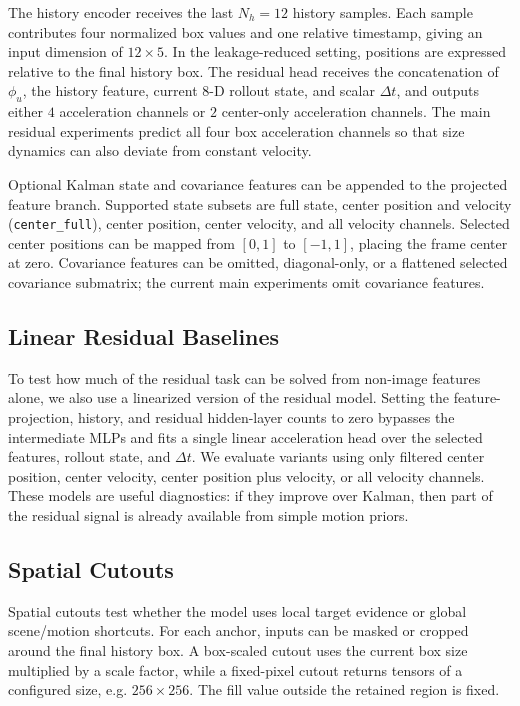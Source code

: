 The history encoder receives the last $N_h=12$ history samples. Each sample contributes four normalized box values and one relative timestamp, giving an input dimension of $12 \times 5$. In the leakage-reduced setting, positions are expressed relative to the final history box. The residual head receives the concatenation of $\phi_u$, the history feature, current $8$-D rollout state, and scalar $\Delta t$, and outputs either $4$ acceleration channels or $2$ center-only acceleration channels. The main residual experiments predict all four box acceleration channels so that size dynamics can also deviate from constant velocity.

Optional Kalman state and covariance features can be appended to the projected feature branch. Supported state subsets are full state, center position and velocity (\texttt{center\_full}), center position, center velocity, and all velocity channels. Selected center positions can be mapped from $[0,1]$ to $[-1,1]$, placing the frame center at zero. Covariance features can be omitted, diagonal-only, or a flattened selected covariance submatrix; the current main experiments omit covariance features.

\subsection{Linear Residual Baselines}

To test how much of the residual task can be solved from non-image features alone, we also use a linearized version of the residual model. Setting the feature-projection, history, and residual hidden-layer counts to zero bypasses the intermediate MLPs and fits a single linear acceleration head over the selected features, rollout state, and $\Delta t$. We evaluate variants using only filtered center position, center velocity, center position plus velocity, or all velocity channels. These models are useful diagnostics: if they improve over Kalman, then part of the residual signal is already available from simple motion priors.

\subsection{Spatial Cutouts}

Spatial cutouts test whether the model uses local target evidence or global scene/motion shortcuts. For each anchor, inputs can be masked or cropped around the final history box. A box-scaled cutout uses the current box size multiplied by a scale factor, while a fixed-pixel cutout returns tensors of a configured size, e.g. $256 \times 256$. The fill value outside the retained region is fixed.

